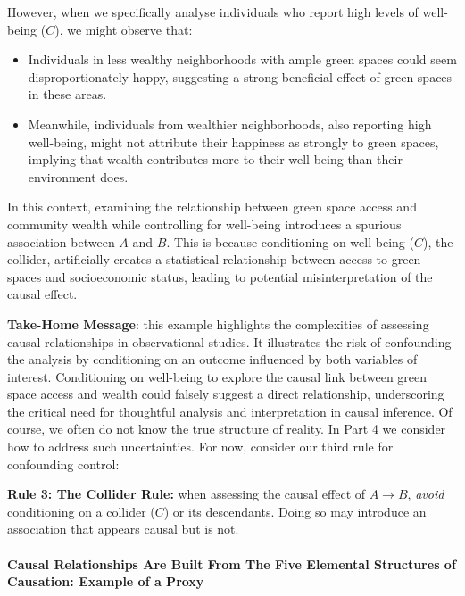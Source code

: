 \documentclass[
  singlecolumn]{article}
\let\oldparagraph\paragraph
\renewcommand{\paragraph}[1]{\oldparagraph{#1}\mbox{}}
\providecommand{\tightlist}{%
  \setlength{\itemsep}{0pt}\setlength{\parskip}{0pt}}\usepackage{longtable,booktabs,array}
\begin{document}
However, when we specifically analyse individuals who report high levels
of well-being (\(\boxed{C}\)), we might observe that:

\begin{itemize}
\tightlist
\item
  Individuals in less wealthy neighborhoods with ample green spaces
  could seem disproportionately happy, suggesting a strong beneficial
  effect of green spaces in these areas.
\item
  Meanwhile, individuals from wealthier neighborhoods, also reporting
  high well-being, might not attribute their happiness as strongly to
  green spaces, implying that wealth contributes more to their
  well-being than their environment does.
\end{itemize}

In this context, examining the relationship between green space access
and community wealth while controlling for well-being introduces a
spurious association between \(A\) and \(B\). This is because
conditioning on well-being (\(C\)), the collider, artificially creates a
statistical relationship between access to green spaces and
socioeconomic status, leading to potential misinterpretation of the
causal effect.

\textbf{Take-Home Message}: this example highlights the complexities of
assessing causal relationships in observational studies. It illustrates
the risk of confounding the analysis by conditioning on an outcome
influenced by both variables of interest. Conditioning on well-being to
explore the causal link between green space access and wealth could
falsely suggest a direct relationship, underscoring the critical need
for thoughtful analysis and interpretation in causal inference. Of
course, we often do not know the true structure of reality.
\hyperref[sec-part4]{In Part 4} we consider how to address such
uncertainties. For now, consider our third rule for confounding control:

\textbf{Rule 3: The Collider Rule:} when assessing the causal effect of
\(A\to B\), \emph{avoid} conditioning on a collider (\(C\)) or its
descendants. Doing so may introduce an association that appears causal
but is not.

\paragraph{Causal Relationships Are Built From The Five Elemental
Structures of Causation: Example of a
Proxy}\label{causal-relationships-are-built-from-the-five-elemental-structures-of-causation-example-of-a-proxy}
\end{document}
